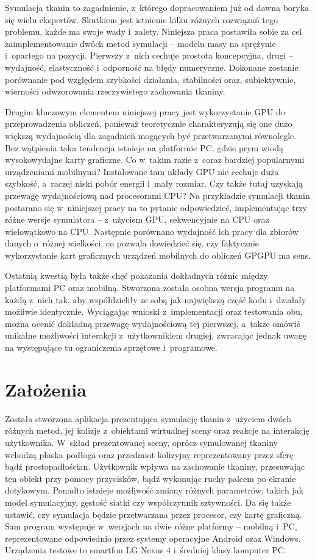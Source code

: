 	Symulacja tkanin to zagadnienie, z~którego dopracowaniem już od dawna boryka się wielu ekspertów. Skutkiem jest istnienie kilku różnych rozwiązań tego problemu, każde ma swoje wady i~zalety. Niniejsza praca postawiła sobie za cel zaimplementowanie dwóch metod symulacji -- modelu masy na sprężynie i~opartego na pozycji. Pierwszy z~nich cechuje prostota koncepcyjna, drugi -- wydajność, elastyczność i~odporność na błędy numeryczne. Dokonane zostanie porównanie pod względem szybkości działania, stabilności oraz, subiektywnie, wierności odwzorowania rzeczywistego zachowania tkaniny.
	
	Drugim kluczowym elementem niniejszej pracy jest wykorzystanie GPU do przeprowadzenia obliczeń, ponieważ teoretycznie charakteryzują się one dużo większą wydajnością dla zagadnień mogących być przetwarzanymi równolegle. Bez wątpienia taka tendencja istnieje na platformie PC, gdzie prym wiodą wysokowydajne karty graficzne. Co w~takim razie z~coraz bardziej popularnymi urządzeniami mobilnymi? Instalowane tam układy GPU nie cechuje duża szybkość, a~raczej niski pobór energii i~mały rozmiar. Czy także tutaj uzyskają przewagę wydajnościową nad procesorami CPU? Na przykładzie symulacji tkanin postarano się w~niniejszej pracy na to pytanie odpowiedzieć, implementując trzy różne wersje symulatora -- z~użyciem GPU, sekwencyjnie na CPU oraz wielowątkowo na CPU. Następnie porównano wydajność ich pracy dla zbiorów danych o~różnej wielkości, co pozwala dowiedzieć się, czy faktycznie wykorzystanie kart graficznych urządzeń mobilnych do obliczeń GPGPU ma sens.
	
	Ostatnią kwestią była także chęć pokazania dokładnych różnic między platformami PC oraz mobilną. Stworzona została osobna wersja programu na każdą z~nich tak, aby współdzieliły ze sobą jak największą część kodu i~działały możliwie identycznie. Wyciągając wnioski z~implementacji oraz testowania obu, można ocenić dokładną przewagę wydajnościową tej pierwszej, a~także omówić unikalne możliwości interakcji z~użytkownikiem drugiej, zwracając jednak uwagę na występujące tu ograniczenia sprzętowe i~programowe. 
	
	\section{Założenia}
	\label{t:wprowadzenie:zalozenia}
	
	Została stworzona aplikacja prezentująca symulację tkanin z~użyciem dwóch różnych metod, jej kolizje z~obiektami wirtualnej sceny oraz reakcje na interakcję użytkownika. W~skład prezentowanej sceny, oprócz symulowanej tkaniny wchodzą płaska podłoga oraz przedmiot kolizyjny reprezentowany przez sferę bądź prostopadłościan. Użytkownik wpływa na zachowanie tkaniny, przesuwając ten obiekt przy pomocy przycisków, bądź wykonując ruchy palcem po ekranie dotykowym. Ponadto istnieje możliwość zmiany różnych parametrów, takich jak model symulacyjny, gęstość siatki czy współczynnik sztywności. Da się także ustawić, czy symulacja będzie przetwarzana przez procesor, czy kartę graficzną. Sam program występuje w~wersjach na dwie różne platformy -- mobilną i~PC, reprezentowane odpowiednio przez systemy operacyjne Android oraz Windows. Urządzenia testowe to smartfon LG Nexus 4 i~średniej klasy komputer PC.
	
